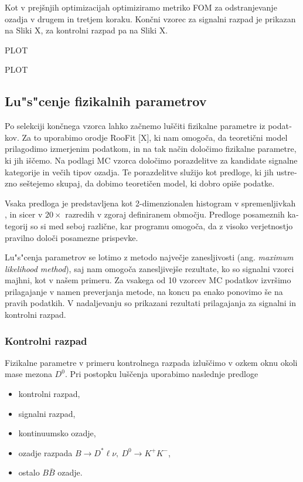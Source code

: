 \begin{otherlanguage}{slovene}
Kot v prejšnjih optimizacijah optimiziramo metriko FOM za odstranjevanje ozadja v drugem in tretjem koraku. Končni vzorec za signalni razpad je prikazan na Sliki X, za kontrolni razpad pa na Sliki X.

PLOT 

PLOT

\subsection{Lu"s"cenje fizikalnih parametrov}

Po selekciji končnega vzorca lahko začnemo luščiti fizikalne parametre iz podatkov. Za to uporabimo orodje RooFit [X], ki nam omogoča, da teoretični model prilagodimo izmerjenim podatkom, in na tak način določimo fizikalne parametre, ki jih iščemo. Na podlagi MC vzorca določimo porazdelitve za kandidate signalne kategorije in večih tipov ozadja. Te porazdelitve služijo kot predloge, ki jih ustrezno seštejemo skupaj, da dobimo teoretičen model, ki dobro opiše podatke.

Vsaka predloga je predstavljena kot 2-dimenzionalen histogram v spremenljivkah \varss, in sicer v $20\times$ razredih v zgoraj definiranem območju. Predloge posameznih kategorij so si med seboj različne, kar programu omogoča, da z visoko verjetnostjo pravilno določi posamezne prispevke.

Lu"s"cenja parametrov se lotimo z metodo največje zanesljivosti (ang. \textit{maximum likelihood method}), saj nam omogoča zanesljivejše rezultate, ko so signalni vzorci majhni, kot v našem primeru. Za vsakega od 10 vzorcev MC podatkov izvršimo prilagajanje v namen preverjanja metode, na koncu pa enako ponovimo še na pravih podatkih. V nadaljevanju so prikazani rezultati prilagajanja za signalni in kontrolni razpad.

\subsubsection{Kontrolni razpad}
Fizikalne parametre v primeru kontrolnega razpada izluščimo v ozkem oknu okoli mase mezona $D^0$. Pri postopku luščenja uporabimo naslednje predloge
\begin{itemize}
\item kontrolni razpad,
\item signalni razpad,
\item kontinuumsko ozadje,
\item ozadje razpada $B\to D^* \ell \nu,~D^0 \to K^+K^-$,
\item ostalo $B \bar B$ ozadje.
\end{itemize}


\end{otherlanguage}
